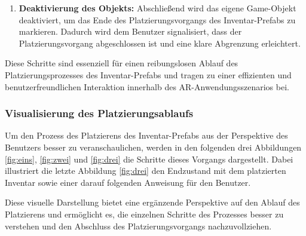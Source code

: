 \begin{itemize}
\begin{enumerate}
    \item \textbf{Deaktivierung des Objekts:} Abschließend wird das eigene Game-Objekt deaktiviert, um das Ende des
    Platzierungsvorgangs des Inventar-Prefabs zu markieren. Dadurch wird dem Benutzer signalisiert, dass der Platzierungsvorgang
    abgeschlossen ist und eine klare Abgrenzung erleichtert.
\end{enumerate}

Diese Schritte sind essenziell für einen reibungslosen Ablauf des Platzierungsprozesses des Inventar-Prefabs und tragen
zu einer effizienten und benutzerfreundlichen Interaktion innerhalb des AR-Anwendungsszenarios bei.

\subsubsection{Visualisierung des Platzierungsablaufs}\label{sec:platzierungsablauf}
Um den Prozess des Platzierens des Inventar-Prefabs aus der Perspektive des Benutzers besser zu veranschaulichen, werden
in den folgenden drei Abbildungen \ref{fig:eins}, \ref{fig:zwei} und \ref{fig:drei} die Schritte dieses Vorgangs dargestellt.
Dabei illustriert die letzte Abbildung \ref{fig:drei} den Endzustand mit dem platzierten Inventar sowie einer darauf
folgenden Anweisung für den Benutzer.

Diese visuelle Darstellung bietet eine ergänzende Perspektive auf den Ablauf des Platzierens und ermöglicht es, die
einzelnen Schritte des Prozesses besser zu verstehen und den Abschluss des Platzierungsvorgangs nachzuvollziehen.


\end{itemize}
